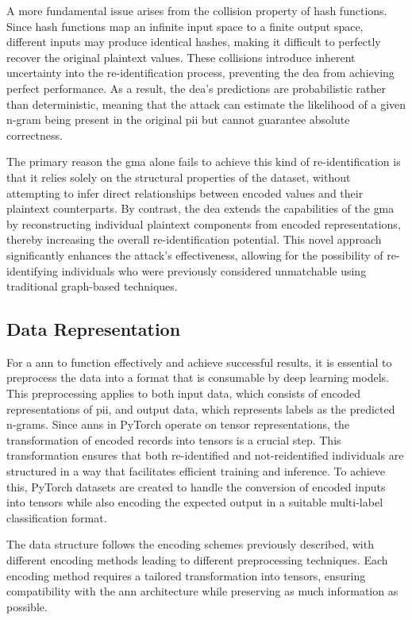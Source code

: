 A more fundamental issue arises from the collision property of hash functions.
Since hash functions map an infinite input space to a finite output space, different inputs may produce identical hashes, making it difficult to perfectly recover the original plaintext values.
These collisions introduce inherent uncertainty into the re-identification process, preventing the \ac{dea} from achieving perfect performance.
As a result, the \ac{dea}'s predictions are probabilistic rather than deterministic, meaning that the attack can estimate the likelihood of a given n-gram being present in the original \ac{pii} but cannot guarantee absolute correctness.

The primary reason the \ac{gma} alone fails to achieve this kind of re-identification is that it relies solely on the structural properties of the dataset, without attempting to infer direct relationships between encoded values and their plaintext counterparts.
By contrast, the \ac{dea} extends the capabilities of the \ac{gma} by reconstructing individual plaintext components from encoded representations, thereby increasing the overall re-identification potential.
This novel approach significantly enhances the attack's effectiveness, allowing for the possibility of re-identifying individuals who were previously considered unmatchable using traditional graph-based techniques.

\subsection{Data Representation} \label{sec:representation}

For a \ac{ann} to function effectively and achieve successful results, it is essential to preprocess the data into a format that is consumable by deep learning models.
This preprocessing applies to both input data, which consists of encoded representations of \ac{pii}, and output data, which represents labels as the predicted n-grams.
Since \ac{ann}s in PyTorch operate on tensor representations, the transformation of encoded records into tensors is a crucial step.
This transformation ensures that both re-identified and not-reidentified individuals are structured in a way that facilitates efficient training and inference.
To achieve this, PyTorch datasets are created to handle the conversion of encoded inputs into tensors while also encoding the expected output in a suitable multi-label classification format.

The data structure follows the encoding schemes previously described, with different encoding methods leading to different preprocessing techniques.
Each encoding method requires a tailored transformation into tensors, ensuring compatibility with the \ac{ann} architecture while preserving as much information as possible.

